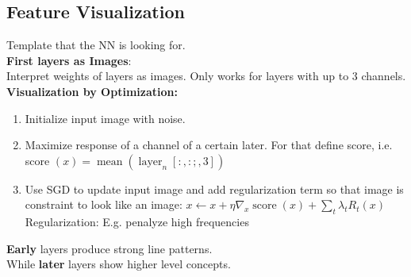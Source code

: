 \documentclass[11pt]{extarticle}
\begin{document}
\begin{multicols*}{3}
		    \subsection*{Feature Visualization} Template that the NN is looking for.\\
		    \textbf{First layers as Images}:\\
		    Interpret weights of layers as images. Only works for layers with up to 3 channels.\\
		    \textbf{Visualization by Optimization:}
		    \begin{enumerate}[leftmargin=*]
                \item Initialize input image with noise.
    		    \item Maximize response of a channel of a certain later. For that define score, i.e.
    		    score $( x ) = \operatorname { mean } \left( \operatorname { layer } _ { n } [ : , : ; , 3 ] \right)$
    		    \item Use SGD to update input image and add regularization term so that image is constraint to look like an image: $x \leftarrow x + \eta \nabla _ { x } \operatorname { score } ( x ) + \sum _ { t } \lambda _ { t } R _ { t } ( x )$\\
    		    Regularization: E.g. penalyze high frequencies
		    \end{enumerate}
		    \textbf{Early} layers produce strong line patterns.\\
		    While \textbf{later} layers show higher level concepts.\\
		    
		    \vspace{1cm}

\end{multicols*}
\end{document}
